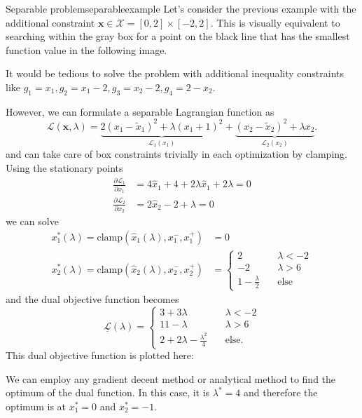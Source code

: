 \begin{example}{Separable problem}{separableexample}
    Let's consider the previous example with the additional constraint $\mathbf{x} \in \mathcal{X} = [0, 2]\times[-2, 2]$.
    This is visually equivalent to searching within the gray box for a point on the black line that has the smallest function value in the following image.
    \begin{center}
        
    \end{center}

    It would be tedious to solve the problem with additional inequality constraints like $g_1= x_1, g_2=x_1-2, g_3=x_2-2, g_4=2-x_2$. 

    However, we can formulate a separable Lagrangian function as
    \begin{equation}
        \mathcal{L}(\mathbf{x}, \lambda) = \underbrace{2 (x_1-\tilde{x}_1)^2 + \lambda (x_1+1)^2}_{\mathcal{L}_1(x_1)} + \underbrace{(x_2-\tilde{x}_2)^2  + \lambda x_2}_{\mathcal{L}_2(x_2)}.
    \end{equation}
    and can take care of box constraints trivially in each optimization by clamping. Using the stationary points 
    \begin{align}
        \frac{\partial \mathcal{L}_1}{\partial x_1} &= 4\hat{x}_1+4+2\lambda \hat{x}_1 + 2 \lambda = 0 \\
        \frac{\partial \mathcal{L}_2}{\partial x_2} &= 2\hat{x}_2-2+\lambda = 0
    \end{align}
    we can solve 
    \begin{align}
        x_1^*(\lambda) = \textrm{clamp}(\hat{x}_1(\lambda), x_1^-, x_1^+) &= 0 \\
        x_2^*(\lambda) = \textrm{clamp}(\hat{x}_2(\lambda), x_2^-, x_2^+) &= 
        \begin{cases}
            2 & \quad \lambda < -2 \\
            -2 & \quad \lambda > 6 \\
            1 - \frac{\lambda}{2} & \quad \text{else}
        \end{cases}
    \end{align}
    and the dual objective function becomes 
    \begin{equation}
        \underline{\mathcal{L}}(\lambda) = 
        \begin{cases}
            3 + 3 \lambda  & \quad \lambda < -2 \\
            11 - \lambda  & \quad \lambda > 6 \\
            2 + 2 \lambda - \frac{\lambda^2}{4}   & \quad \text{else.}
        \end{cases}
    \end{equation}
    This dual objective function is plotted here:
    \begin{center}
        
    \end{center}
    We can employ any gradient decent method or analytical method to find the optimum of the dual function. In this case, it is $\lambda^*=4$ and therefore the optimum is at $x_1^*=0$ and $x_2^*=-1$.    
\end{example}


 